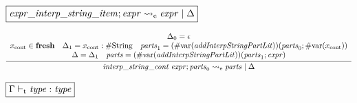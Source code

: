 $\fbox{$\mathit{expr\_interp\_string\_item}; \mathit{expr} \rightsquigarrow_\mathrm{e} \mathit{expr} \mid \Delta$}$

\begin{gather*}
    \infer{\mathit{interp\_string\_cont}\; \mathit{expr}; \mathit{parts}_0 \rightsquigarrow_\mathrm{e} \mathit{parts} \mid \Delta}{
        \begin{array}{c}
            \Delta_0 = \epsilon
            \\
            x_\mathrm{cont} \in \mathbf{fresh}
            \hspace{1em}
            \Delta_1 = x_\mathrm{cont}: \mathrm{\#String}
            \hspace{1em}
            \mathit{parts}_1 = (\mathrm{\#var}(\mathit{addInterpStringPartLit}))(\mathit{parts}_0; \mathrm{\#var}(x_\mathrm{cont}))
            \\
            \Delta = \Delta_1
            \hspace{1em}
            \mathit{parts} = (\mathrm{\#var}(\mathit{addInterpStringPartLit}))(\mathit{parts}_1; \mathit{expr})
        \end{array}
    }
\end{gather*}

$\fbox{$\Gamma \vdash_\mathrm{t} \mathit{type}: \mathit{type}$}$

